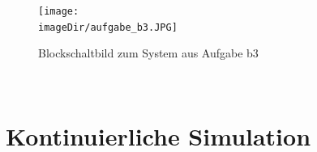 \documentclass[11pt, a4paper, twoside]{article}   	%
\newcommand{\imageDir}{./images/}
\begin{document}
\begin{figure}
\centering
\texttt{[image: \\imageDir/aufgabe\_b3.JPG]}
\caption{Blockschaltbild zum System aus Aufgabe b3}
\label{fig:exercise-b1}
\end{figure}
\ \newpage

\section{Kontinuierliche Simulation}
\label{sec:continous-simulation}
\end{document}
